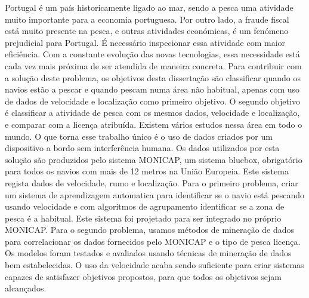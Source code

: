 \abstractPT  %

Portugal é um país historicamente ligado ao mar, sendo a pesca uma atividade muito importante para a economia portuguesa. Por outro lado, a fraude fiscal está muito presente na pesca, e outras atividades económicas, é um fenómeno prejudicial para Portugal. É necessário inspecionar essa atividade com maior eficiência. Com a constante evolução das novas tecnologias, essa necessidade está cada vez mais próxima de ser atendida de maneira concreta.
Para contribuir com a solução deste problema, os objetivos desta dissertação são classificar quando os navios estão a pescar e quando pescam numa área não habitual, apenas com uso de dados de velocidade e localização como primeiro objetivo. O segundo objetivo é classificar a atividade de pesca com os mesmos dados, velocidade e localização, e comparar com a licença atribuída.
Existem vários estudos nessa área em todo o mundo. O que torna esse trabalho único é o uso de dados criados por um dispositivo a bordo sem interferência humana. 
Os dados utilizados por esta solução são produzidos pelo sistema MONICAP, um sistema bluebox, obrigatório para todos os navios com mais de 12 metros na União Europeia. Este sistema regista dados de velocidade, rumo e localização.
Para o primeiro problema, criar um sistema de aprendizagem automatica para identificar se o navio está pescando usando velocidade e com algoritmos de agrupamento identificar se a zona de pesca é a habitual. Este sistema foi projetado para ser integrado no próprio MONICAP. Para o segundo problema, usamos métodos de mineração de dados para correlacionar os dados fornecidos pelo MONICAP e o tipo de pesca licença.
Os modelos foram testados e avaliados usando técnicas de mineração de dados bem estabelecidas.
O uso da velocidade acaba sendo suficiente para criar sistemas capazes de satisfazer
objetivos propostos, para que todos os objetivos sejam alcançados.


